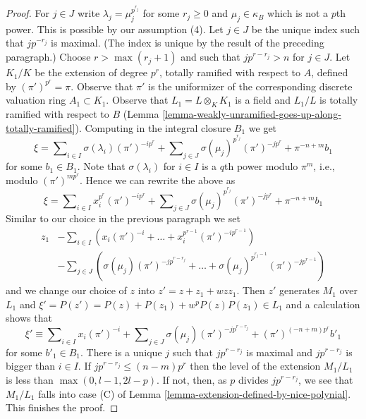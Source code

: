 \begin{proof}
\medskip\noindent
For $j \in J$ write $\lambda_j = \mu_j^{p^{r_j}}$ for some $r_j \geq 0$ and
$\mu_j \in \kappa_B$ which is not a $p$th power. This is possible by our
assumption (4). Let $j \in J$ be the unique index such that $j p^{-r_j}$
is maximal. (The index is unique by the result of the preceding paragraph.)
Choose $r > \max(r_j + 1)$ and such that $j p^{r - r_j} > n$ for $j \in J$.
Let $K_1/K$ be the extension of degree $p^r$, totally ramified
with respect to $A$, defined by $(\pi')^{p^r} = \pi$.
Observe that $\pi'$ is the uniformizer of the
corresponding discrete valuation ring $A_1 \subset K_1$.
Observe that $L_1 = L \otimes_K K_1$ is a field and $L_1/L$
is totally ramified with respect to $B$
(Lemma \ref{lemma-weakly-unramified-goes-up-along-totally-ramified}).
Computing in the integral closure $B_1$ we get
$$
\xi = \sum\nolimits_{i \in I} \sigma(\lambda_i) (\pi')^{-i p^r} +
\sum\nolimits_{j \in J} \sigma(\mu_j)^{p^{r_j}} (\pi')^{-j p^r} +
\pi^{-n + m} b_1
$$
for some $b_1 \in B_1$. Note that $\sigma(\lambda_i)$ for $i \in I$
is a $q$th power modulo $\pi^m$, i.e., modulo $(\pi')^{m p^r}$.
Hence we can rewrite the above as
$$
\xi = \sum\nolimits_{i \in I} x_i^{p^r} (\pi')^{-i p^r} +
\sum\nolimits_{j \in J} \sigma(\mu_j)^{p^{r_j}} (\pi')^{- j p^r}
+ \pi^{-n + m}b_1
$$
Similar to our choice in the previous paragraph we set
\begin{align*}
z_1 & - \sum\nolimits_{i \in I}
\left(x_i (\pi')^{-i} + \ldots + x_i^{p^{r - 1}} (\pi')^{-i p^{r - 1}}\right)
\\
& - \sum\nolimits_{j \in J}
\left(
\sigma(\mu_j) (\pi')^{- j p^{r - r_j}}
+ \ldots +
\sigma(\mu_j)^{p^{r_j - 1}} (\pi')^{- j p^{r - 1}}
\right)
\end{align*}
and we change our choice of $z$ into $z' = z + z_1 + wzz_1$.
Then $z'$ generates $M_1$ over $L_1$ and
$\xi' = P(z') = P(z) + P(z_1) + w^p P(z) P(z_1) \in L_1$
and a calculation shows that
$$
\xi' \equiv
\sum\nolimits_{i \in I} x_i (\pi')^{-i} +
\sum\nolimits_{j \in J} \sigma(\mu_j) (\pi')^{- j p^{r - r_j}} +
(\pi')^{(-n + m)p^r}b'_1
$$
for some $b'_1 \in B_1$. There is a unique $j$ such that $j p^{r - r_j}$
is maximal and $j p^{r - r_j}$ is bigger than $i \in I$. If
$j p^{r - r_j} \leq (n - m)p^r$ then the level of the extension $M_1/L_1$
is less than $\max(0, l - 1, 2l - p)$. If not, then, as $p$ divides
$j p^{r - r_j}$, we see that $M_1 / L_1$ falls into case (C) of
Lemma \ref{lemma-extension-defined-by-nice-polynial}.
This finishes the proof.
\end{proof}

